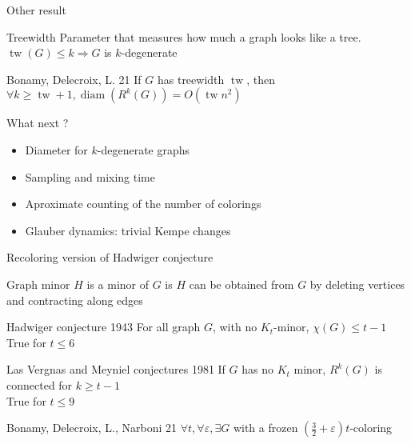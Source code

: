 \documentclass[11pt,xcolor=dvipsnames,presentation]{beamer}
\newcommand{\backupbegin}{
   \newcounter{finalframe}
   \setcounter{finalframe}{\value{framenumber}}
}
\newcommand{\backupend}{
   \setcounter{framenumber}{\value{finalframe}}
}
\DeclareMathOperator{\diam}{diam}
\DeclareMathOperator{\tw}{tw}
\begin{document}
\begin{frame}{Other result}
  \begin{block}{Treewidth}
    Parameter that measures how much a graph looks like a tree.\\
    $\tw(G) \le k \Rightarrow G$ is $k$-degenerate
  \end{block}
  
  \begin{block}{Bonamy, Delecroix, L. 21}
    If $G$ has treewidth $\tw$, then $\forall k \ge \tw+1, \diam(R^k(G)) = O(\tw n^2)$  
  \end{block}
\end{frame}

\begin{frame}{What next ?}
  \begin{itemize}
  \item Diameter for $k$-degenerate graphs
  \item Sampling and mixing time
  \item Aproximate counting of the number of colorings
  \item Glauber dynamics: trivial Kempe changes
  \end{itemize}
\end{frame}
\backupbegin
\begin{frame}{Recoloring version of Hadwiger conjecture}
  \begin{block}{Graph minor}
    $H$ is a minor of $G$ is $H$ can be obtained from $G$ by deleting vertices
    and contracting along edges
  \end{block}

  \begin{block}{Hadwiger conjecture 1943}
    For all graph $G$, with no $K_t$-minor, $\chi(G) \le t-1$\\
    True for $t \le 6$ 
  \end{block}

  \begin{block}{Las Vergnas and Meyniel conjectures 1981}
    If $G$ has no $K_t$ minor, $R^k(G)$ is connected for $k \ge t-1$\\
    True for $t \le 9$    
  \end{block}

  \begin{block}{Bonamy, Delecroix, L.,  Narboni 21}
    $\forall t, \forall \varepsilon, \exists G$ with a frozen $(\frac{3}{2} + \varepsilon)t$-coloring
  \end{block}

  
\end{frame}


\backupend
\end{document}
